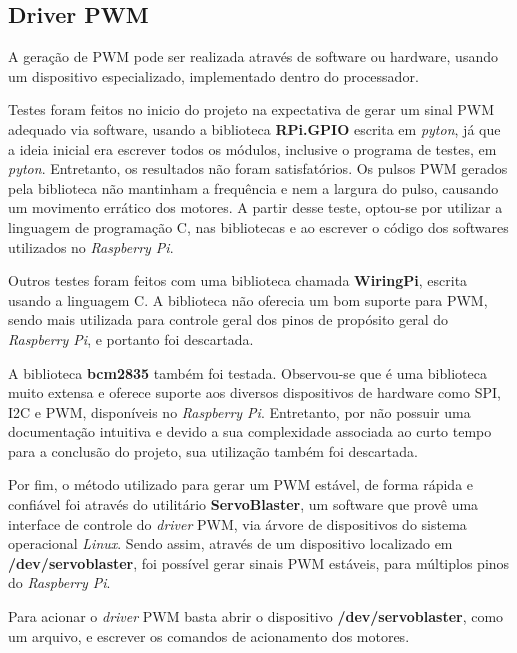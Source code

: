 \subsection{Driver PWM}
\label{subsec:deiverpwm}

A geração de PWM pode ser realizada através de software ou hardware, usando um dispositivo especializado, implementado dentro do processador.\par

Testes foram feitos no inicio do projeto na expectativa de gerar um sinal PWM adequado via software, usando a biblioteca \textbf{RPi.GPIO} escrita em \textit{pyton}, já que a ideia inicial era escrever todos os módulos, inclusive o programa de testes, em \textit{pyton}. Entretanto, os resultados não foram satisfatórios. Os pulsos PWM gerados pela biblioteca não mantinham a frequência e nem a largura do pulso, causando um movimento errático dos motores. A partir desse teste, optou-se por utilizar a linguagem de programação C, nas bibliotecas e ao escrever o código dos softwares utilizados no \textit{Raspberry Pi}.\par

Outros testes foram feitos com uma biblioteca chamada \textbf{WiringPi}, escrita usando a linguagem C. A biblioteca não oferecia um bom suporte para PWM, sendo mais utilizada para controle geral dos pinos de propósito geral do \textit{Raspberry Pi}, e portanto foi descartada.\par

A biblioteca \textbf{bcm2835} também foi testada. Observou-se que é uma biblioteca muito extensa e oferece suporte aos diversos dispositivos de hardware como SPI, I2C e PWM, disponíveis no \textit{Raspberry Pi}. Entretanto, por não possuir uma documentação intuitiva e devido a sua complexidade associada ao curto tempo para a conclusão do projeto, sua utilização também foi descartada.\par

Por fim, o método utilizado para gerar um PWM estável, de forma rápida e confiável foi através do utilitário \textbf{ServoBlaster}, um software que provê uma interface de controle do \textit{driver} PWM, via árvore de dispositivos do sistema operacional \textit{Linux}. Sendo assim, através de um dispositivo localizado em \textbf{/dev/servoblaster}, foi possível gerar sinais PWM estáveis, para múltiplos pinos do \textit{Raspberry Pi}.\par 

Para acionar o \textit{driver} PWM basta abrir o dispositivo \textbf{/dev/servoblaster}, como um arquivo, e escrever os comandos de acionamento dos motores.\par

